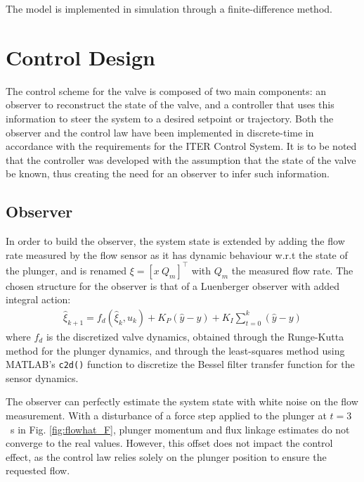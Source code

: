 \documentclass[letterpaper, 10pt, conference]{ieeeconf}
\begin{document}
The model is implemented in simulation through a finite-difference method.

\section{Control Design}\label{sec:ctrl}
The control scheme for the valve is composed of two main components: an observer to reconstruct the state of the valve, and a controller that uses this information to steer the system to a desired setpoint or trajectory. Both the observer and the control law have been implemented in discrete-time in accordance with the requirements for the ITER Control System. It is to be noted that the controller was developed with the assumption that the state of the valve be known, thus creating the need for an observer to infer such information.

\subsection{Observer}
In order to build the observer, the system state is extended by adding the flow rate measured by the flow sensor as it has dynamic behaviour w.r.t the state of the plunger, and is renamed $\xi = [x \ Q_m]^\top$ with $Q_m$ the measured flow rate.
The chosen structure for the observer is that of a Luenberger observer with added integral action:
\begin{align}
    \hat{\xi}_{k+1} = f_d(\hat{\xi}_k, u_k) + K_P(\hat{y}-y) + K_I \displaystyle\sum_{t=0}^{k}(\hat{y}-y)
\end{align}
where $f_d$ is the discretized valve dynamics, obtained through the Runge-Kutta method for the plunger dynamics, and through the least-squares method using MATLAB's \verb|c2d()| function to discretize the Bessel filter transfer function for the sensor dynamics. 

The observer can perfectly estimate the system state with white noise on the flow measurement. With a disturbance of a force step applied to the plunger at $t=3$~\unit{s} in Fig. \ref{fig:flowhat_F}, plunger momentum and flux linkage estimates do not converge to the real values. However, this offset does not impact the control effect, as the control law relies solely on the plunger position to ensure the requested flow.
\end{document}
